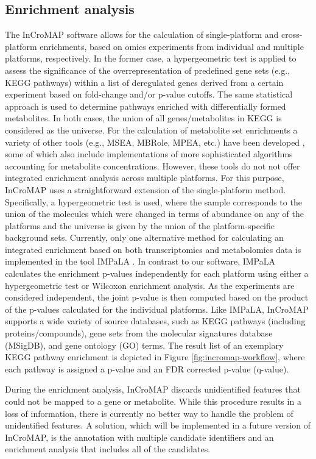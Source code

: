 \documentclass[final,5p,times,twocolumn]{elsarticle}
\newcommand\red[1]{{\color{red}#1}}
\begin{document}
\subsection{Enrichment analysis}
\red{The InCroMAP software allows for the calculation of single-platform and cross-platform enrichments, based on omics experiments from individual and multiple platforms, respectively. In the former case, a hypergeometric test is applied to assess the significance of the overrepresentation of predefined gene sets (e.g., KEGG pathways) within a list of deregulated genes derived from a certain experiment based on fold-change and/or p-value cutoffs. The same statistical approach is used to determine pathways enriched with differentially formed metabolites. In both cases, the union of all genes/metabolites in KEGG is considered as the universe. For the calculation of metabolite set enrichments a variety of other tools (e.g., MSEA, MBRole, MPEA, etc.) have been developed \cite{Xia2010,Chagoyen2011,Kankainen2011}, some of which also include implementations of more sophisticated algorithms accounting for metabolite concentrations. However, these tools do not not offer integrated enrichment analysis across multiple 
platforms. For this purpose, InCroMAP uses a straightforward extension of the single-platform method. Specifically, a hypergeometric test is used, where the sample corresponds to the union of the molecules which were changed in terms of abundance on any of the platforms and the universe is given by the union of the platform-specific background sets. Currently, only one alternative method for calculating an integrated enrichment based on both transcriptomics and metabolomics data is implemented in the tool IMPaLA \cite{Kamburov2011}. In contrast to our software, IMPaLA calculates the enrichment p-values independently for each platform using either a hypergeometric test or Wilcoxon enrichment analysis. As the experiments are considered independent, the joint p-value is then computed based on the product of the p-values calculated for the individual platforms. Like IMPaLA, InCroMAP supports a wide variety of source databases, such as} KEGG pathways (including proteins/compounds), gene sets from the molecular 
signatures database (MSigDB), and gene ontology (GO) terms. The result list of an exemplary KEGG pathway enrichment is depicted in Figure \ref{fig:incromap-workflow}, where each pathway is assigned a p-value and an FDR corrected p-value (q-value).

During the enrichment analysis, InCroMAP discards unidientified features that could not be mapped to a gene or metabolite. While this procedure results in a loss of information, there is currently no better way to handle the problem of unidentified features. A solution, which will be implemented in a future version of InCroMAP, is the annotation with multiple candidate identifiers and an enrichment analysis that includes all of the candidates.
\end{document}

